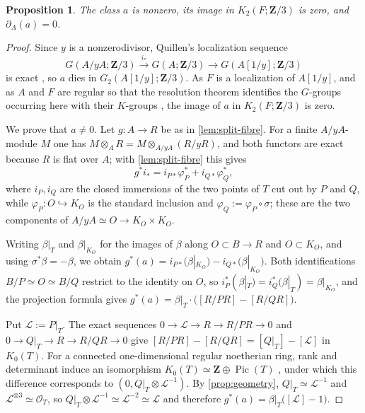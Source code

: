 \documentclass[10pt]{amsart}
\DeclareMathOperator{\Pic}{Pic}
\newtheorem{proposition}[proposition]{Proposition}
\theoremstyle{remark}
\begin{document}
\begin{proposition}\label{prop:class}
	The class $a$ is nonzero, its image in $K_2(F;\mathbf Z/3)$ is zero, and
	$\partial_A(a)=0$.
\end{proposition}
\begin{proof}
	Since $y$ is a nonzerodivisor, Quillen's localization sequence
	\[
	G(A/yA;\mathbf Z/3)\xrightarrow{\ i_*\ }
	G(A;\mathbf Z/3)\longrightarrow
	G(A[1/y];\mathbf Z/3)
	\]
	is exact \cite[\S7]{Quillen73}, so $a$ dies in $G_2(A[1/y];\mathbf Z/3)$.
	As $F$ is a localization of $A[1/y]$, and as $A$ and $F$ are regular so
	that the resolution theorem identifies the $G$-groups occurring here with
	their $K$-groups \cite[Thm.~V.3.3]{Weibel13KBook}, the image of $a$ in
	$K_2(F;\mathbf Z/3)$ is zero.
	
	We prove that $a\ne0$.  Let $g\colon A\to R$ be as in
	\cref{lem:split-fibre}.  For a finite $A/yA$-module $M$ one has
	$M\otimes_AR=M\otimes_{A/yA}(R/yR)$, and both functors are exact because
	$R$ is flat over $A$; with \cref{lem:split-fibre} this gives
	\[
	g^*i_*=i_{P*}\varphi_P^*+i_{Q*}\varphi_Q^* ,
	\]
	where \(i_P,i_Q\) are the closed immersions of the two points of \(T\)
	cut out by \(P\) and \(Q\),	while
	\(\varphi_P\colon O\hookrightarrow K_O\) is the standard inclusion and
	\(\varphi_Q:=\varphi_P\circ\sigma\); these are the two components of
	\(A/yA\simeq O\to K_O\times K_O\).
	
	
	
	Writing $\beta|_T$ and
	$\beta|_{K_O}$ for the images of $\beta$ along $O\subset B\to R$ and
	$O\subset K_O$, and using $\sigma^*\beta=-\beta$, we obtain
	\(
	g^*(a)=i_{P*}\bigl(\beta|_{K_O}\bigr)-i_{Q*}\bigl(\beta|_{K_O}\bigr).
	\)
	Both identifications $B/P\simeq O\simeq B/Q$ restrict to the identity on
	$O$, so $i_P^*(\beta|_T)=i_Q^*(\beta|_T)=\beta|_{K_O}$, and the
	projection formula gives
	$g^*(a)=\beta|_T\cdot\bigl([R/PR]-[R/QR]\bigr)$.
	
	
	Put \(\mathcal L:=P|_T\).  The exact sequences
	\(0\to\mathcal L\to R\to R/PR\to0\) and
	\(0\to Q|_T\to R\to R/QR\to0\) give
	\(
	[R/PR]-[R/QR]=[Q|_T]-[\mathcal L]
	\)
	in
	\(
	K_0(T).
	\)
	For a connected one-dimensional regular noetherian ring, rank and
	determinant induce an isomorphism
	\(K_0(T)\simeq\mathbf Z\oplus\Pic(T)\)
	\cite[Cor.~II.2.6.3]{Weibel13KBook}, under which this difference
	corresponds to
	\((0,Q|_T\otimes\mathcal L^{-1})\).
	By \cref{prop:geometry},
	\(Q|_T\simeq\mathcal L^{-1}\) and
	\(\mathcal L^{\otimes3}\simeq\mathcal O_T\), so
	\(Q|_T\otimes\mathcal L^{-1}\simeq
	\mathcal L^{-2}\simeq\mathcal L\)
	and therefore
	\(
	g^*(a)=\beta|_T\bigl([\mathcal L]-1\bigr).
	\)
	

\end{proof}
\end{document}
